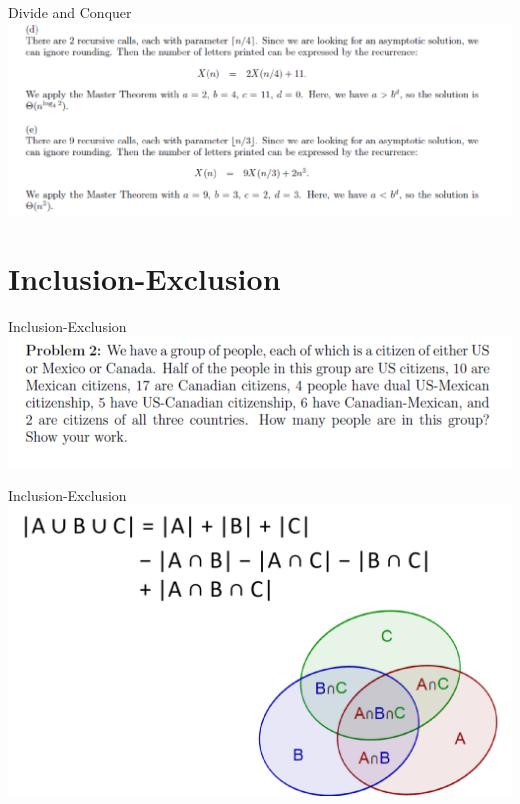 \documentclass{beamer}
\begin{document}
\begin{frame}{Divide and Conquer}
    \centering
    \includegraphics[width=.95\linewidth]{e.PNG}
\end{frame}

\section{Inclusion-Exclusion }

\begin{frame}{Inclusion-Exclusion}
    \centering
    \includegraphics[width=.7\linewidth]{3.PNG}
\end{frame}
\begin{frame}{Inclusion-Exclusion}
    \centering
    \includegraphics[width=.7\linewidth]{4.PNG}
\end{frame}
\end{document}
